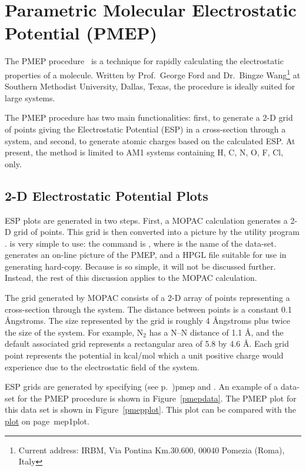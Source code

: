 \section{Parametric Molecular Electrostatic Potential (PMEP)}
The PMEP procedure~\cite{pmep1,pmep2} is a technique for rapidly calculating 
the electrostatic properties of a molecule.  Written by Prof.\ George Ford and
Dr.\ Bingze  Wang\footnote{Current address: IRBM, Via Pontina Km.30.600, 00040
Pomezia (Roma), Italy} at Southern Methodist University, Dallas, Texas, the
procedure is ideally suited for large systems.  

The PMEP procedure has two main functionalities: first, to generate a 2-D grid
of points giving the Electrostatic Potential (ESP) in a cross-section through a
system, and second, to generate atomic charges based on the calculated ESP. At
present, the method is limited to AM1 systems containing H, C, N, O, F, Cl,
only. 

\subsection{2-D Electrostatic Potential Plots}
ESP plots are generated in two steps.  First, a MOPAC calculation generates a
2-D grid of points.  This grid is then converted into a picture by the utility
program .   is very simple to use: the command is
, where  is the name of the
data-set.   generates an on-line picture of the PMEP, and a HPGL
file suitable for use in generating hard-copy.  Because  is so
simple, it will not be discussed further.  Instead, the rest of this discussion
applies to the MOPAC calculation.

The grid generated by MOPAC consists of a 2-D array of points representing a
cross-section through the system.  The distance between points is a constant
0.1 \AA ngstroms.  The size represented by the grid is roughly 4 \AA ngstroms 
plus twice the size of the system.  For example, N$_2$ has a N--N distance of
1.1 \AA , and the default associated grid represents a rectangular area of 5.8
by 4.6 \AA .    Each grid point represents the potential in kcal/mol which a
unit positive charge would experience due to the electrostatic field of the
system.

ESP grids are generated by specifying 
\hyperref[pageref]{}{(see p.~}{)}{pmep} and .
An example of a data-set for the PMEP procedure is shown in
Figure~\ref{pmepdata}. The PMEP plot for this data set is shown in
Figure~\ref{pmepplot}. This plot can be compared with the
\hyperref[pageref]{ plot}{ on page~}{}{mep1plot}.

